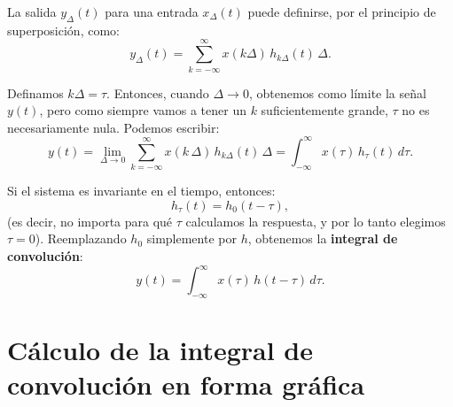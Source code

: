 \documentclass[11pt,a4paper,openany]{book}
\begin{document}
La salida $y_{\Delta}(t)$ para una entrada $x_{\Delta}(t)$ puede definirse, por el principio de superposición, como:
\begin{equation}
	y_{\Delta}(t) = \sum_{k=-\infty}^{\infty} x(k\Delta) \, h_{k\Delta}(t) \, \Delta.
\end{equation}

Definamos $k\Delta = \tau$. Entonces, cuando $\Delta \to 0$, obtenemos como límite la señal $y(t)$, pero como siempre vamos a tener un $k$ suficientemente grande, $\tau$ no es necesariamente nula. Podemos escribir:
\begin{equation}
	y(t) = \lim_{\Delta \to 0} \sum_{k=-\infty}^{\infty} x(k \, \Delta) \, h_{k\Delta}(t) \, \Delta = \int_{-\infty}^{\infty} x(\tau) \, h_{\tau}(t) \, d\tau .
\end{equation}

Si el sistema es invariante en el tiempo, entonces:
\begin{equation}
	h_{\tau}(t) = h_{0}(t-\tau) ,
\end{equation}
(es decir, no importa para qué $\tau$ calculamos la respuesta, y por lo tanto elegimos $\tau=0$). Reemplazando $h_0$ simplemente por $h$, obtenemos la \textbf{integral de convolución}:
\begin{equation}
	y(t) = \int_{-\infty}^{\infty} x(\tau) \, h(t-\tau) \, d\tau .
\end{equation}

\section{Cálculo de la integral de convolución en forma gráfica}
\end{document}
